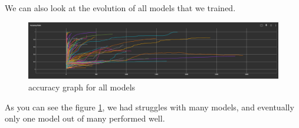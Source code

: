\documentclass[../paper.tex]{subfiles}
\begin{document}
    We can also look at the evolution of all models that we trained.
    \begin{figure}[h]
        \centering
        \includegraphics[width=\linewidth]{accuracy_graph_all}
        \caption{accuracy graph for all models}
        \label{fig:all_models}
    \end{figure}
    As you can see the figure \ref{fig:all_models}, we had struggles with many models, and eventually only one model out of many performed well.
\end{document}
